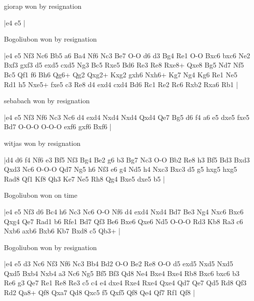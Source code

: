 \showboard

giorap won by resignation

\makegametitle
|e4 e5  |

\showboard

Bogoliubon won by resignation

\makegametitle
|e4 e5 Nf3 Nc6 Bb5 a6 Ba4 Nf6 Nc3 Be7 O-O d6 d3 Bg4 Re1 O-O Bxc6 bxc6 Ne2 Bxf3 gxf3 d5 exd5 cxd5 Ng3 Bc5 Rxe5 Bd6 Re3 Re8 Rxe8+ Qxe8 Bg5 Nd7 Nf5 Bc5 Qf1 f6 Bh6 Qg6+ Qg2 Qxg2+ Kxg2 gxh6 Nxh6+ Kg7 Ng4 Kg6 Re1 Ne5 Rd1 h5 Nxe5+ fxe5 c3 Re8 d4 exd4 cxd4 Bd6 Rc1 Re2 Rc6 Rxb2 Rxa6 Rb1  |

\showboard

sebabach won by resignation

\makegametitle
|e4 e5 Nf3 Nf6 Nc3 Nc6 d4 exd4 Nxd4 Nxd4 Qxd4 Qe7 Bg5 d6 f4 a6 e5 dxe5 fxe5 Bd7 O-O-O O-O-O exf6 gxf6 Bxf6  |

\showboard

witjas won by resignation

\makegametitle
|d4 d6 f4 Nf6 e3 Bf5 Nf3 Bg4 Be2 g6 b3 Bg7 Nc3 O-O Bb2 Re8 h3 Bf5 Bd3 Bxd3 Qxd3 Nc6 O-O-O Qd7 Ng5 h6 Nf3 e6 g4 Nd5 h4 Nxc3 Bxc3 d5 g5 hxg5 hxg5 Rad8 Qf1 Kf8 Qh3 Ke7 Ne5 Rh8 Qg4 Bxe5 dxe5 b5  |

\showboard

Bogoliubon won on time

\makegametitle
|e4 e5 Nf3 d6 Bc4 h6 Nc3 Nc6 O-O Nf6 d4 exd4 Nxd4 Bd7 Be3 Ng4 Nxc6 Bxc6 Qxg4 Qe7 Rad1 b6 Rfe1 Bd7 Qf3 Be6 Bxe6 Qxe6 Nd5 O-O-O Rd3 Kb8 Ra3 c6 Nxb6 axb6 Bxb6 Kb7 Bxd8 c5 Qb3+  |

\showboard

Bogoliubon won by resignation

\makegametitle
|e4 e5 d3 Nc6 Nf3 Nf6 Nc3 Bb4 Bd2 O-O Be2 Re8 O-O d5 exd5 Nxd5 Nxd5 Qxd5 Bxb4 Nxb4 a3 Nc6 Ng5 Bf5 Bf3 Qd8 Ne4 Bxe4 Bxe4 Rb8 Bxc6 bxc6 b3 Re6 g3 Qe7 Re1 Re8 Re3 c5 c4 e4 dxe4 Rxe4 Rxe4 Qxe4 Qd7 Qe7 Qd5 Rd8 Qf3 Rd2 Qa8+ Qf8 Qxa7 Qd8 Qxc5 f5 Qxf5 Qf8 Qe4 Qf7 Rf1 Qf8  |

